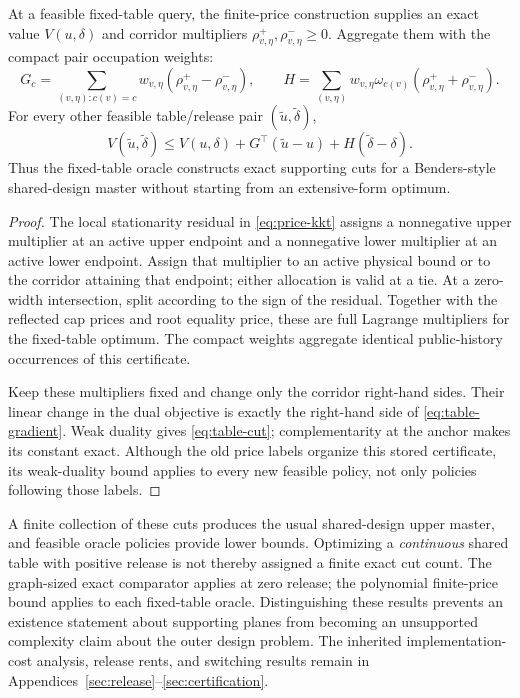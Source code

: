\begin{proposition}\label{prop:table-oracle}
At a feasible fixed-table query, the finite-price construction supplies an exact value $V(u,\delta)$ and corridor multipliers $\rho^+_{v,\eta},\rho^-_{v,\eta}\geq0$. Aggregate them with the compact pair occupation weights:
\begin{equation}\label{eq:table-gradient}
 G_c=\sum_{(v,\eta):c(v)=c}w_{v,\eta}(\rho^+_{v,\eta}-\rho^-_{v,\eta}),
 \qquad H=\sum_{(v,\eta)}w_{v,\eta}\omega_{c(v)}(\rho^+_{v,\eta}+\rho^-_{v,\eta}).
\end{equation}
For every other feasible table/release pair $(\widetilde u,\widetilde\delta)$,
\begin{equation}\label{eq:table-cut}
 V(\widetilde u,\widetilde\delta)
 \leq V(u,\delta)+G^\top(\widetilde u-u)+H(\widetilde\delta-\delta).
\end{equation}
Thus the fixed-table oracle constructs exact supporting cuts for a Benders-style shared-design master without starting from an extensive-form optimum.
\end{proposition}
\begin{proof}
The local stationarity residual in \eqref{eq:price-kkt} assigns a nonnegative upper multiplier at an active upper endpoint and a nonnegative lower multiplier at an active lower endpoint. Assign that multiplier to an active physical bound or to the corridor attaining that endpoint; either allocation is valid at a tie. At a zero-width intersection, split according to the sign of the residual. Together with the reflected cap prices and root equality price, these are full Lagrange multipliers for the fixed-table optimum. The compact weights aggregate identical public-history occurrences of this certificate.

Keep these multipliers fixed and change only the corridor right-hand sides. Their linear change in the dual objective is exactly the right-hand side of \eqref{eq:table-gradient}. Weak duality gives \eqref{eq:table-cut}; complementarity at the anchor makes its constant exact. Although the old price labels organize this stored certificate, its weak-duality bound applies to every new feasible policy, not only policies following those labels.
\end{proof}
A finite collection of these cuts produces the usual shared-design upper master, and feasible oracle policies provide lower bounds. Optimizing a \emph{continuous} shared table with positive release is not thereby assigned a finite exact cut count. The graph-sized exact comparator applies at zero release; the polynomial finite-price bound applies to each fixed-table oracle. Distinguishing these results prevents an existence statement about supporting planes from becoming an unsupported complexity claim about the outer design problem. The inherited implementation-cost analysis, release rents, and switching results remain in Appendices~\ref{sec:release}--\ref{sec:certification}.
